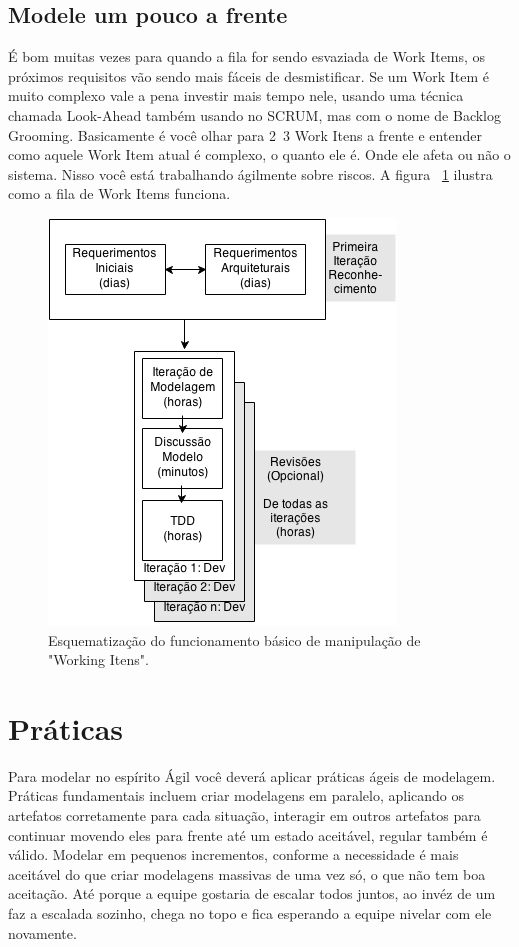 \documentclass[conference]{IEEEtran}
\begin{document}
\subsection{Modele um pouco a frente}
É bom muitas vezes para quando a fila for sendo esvaziada de Work Items, os próximos requisitos vão sendo mais fáceis de desmistificar. Se um Work Item é muito complexo vale a pena investir mais tempo nele, usando uma técnica chamada Look-Ahead também usando no SCRUM, mas com o nome de Backlog Grooming. Basicamente é você olhar para 2~3 Work Itens a frente e entender como aquele Work Item atual é complexo, o quanto ele é. Onde ele afeta ou não o sistema. Nisso você está trabalhando ágilmente sobre riscos. A figura ~\ref{fig:workitens} ilustra como a fila de Work Items funciona.

\begin{figure}[ht]
\includegraphics[scale=0.65]{amdd.png}
\caption{Esquematização do funcionamento básico de manipulação de "Working Itens".}
\label{fig:workitens}
\end{figure}

\section{Práticas}
Para modelar no espírito Ágil você deverá aplicar práticas ágeis de modelagem. Práticas fundamentais incluem criar modelagens em paralelo, aplicando os artefatos corretamente para cada situação, interagir em outros artefatos para continuar movendo eles para frente até um estado aceitável, regular também é válido. Modelar em pequenos incrementos, conforme a necessidade é mais aceitável do que criar modelagens massivas de uma vez só, o que não tem boa aceitação. Até porque a equipe gostaria de escalar todos juntos, ao invéz de um faz a escalada sozinho, chega no topo e fica esperando a equipe nivelar com ele novamente.
\end{document}
